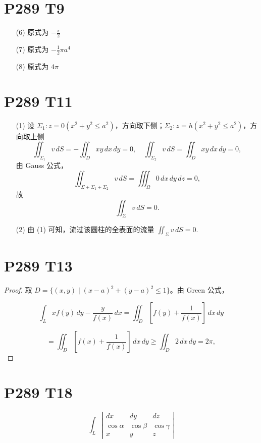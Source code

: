 \documentclass{article}
\begin{document}
\section*{P289 T9}

\begin{itemize}
    \item [(6)] 原式为 $-\frac{\pi}{2}$
    \item [(7)] 原式为 $-\frac{1}{2}\pi a^4$
    \item [(8)] 原式为 $4\pi$
\end{itemize}

\section{P289 T11}

\begin{itemize}
    \item [(1)] 设 \(\Sigma_1: z = 0 (x^2 + y^2 \leq a^2)\)，方向取下侧；\(\Sigma_2: z = h(x^2 + y^2 \leq a^2)\)，方向取上侧
\[
\iint_{\Sigma_1} v \, dS = - \iint_D xy \, dx \, dy = 0, \quad \iint_{\Sigma_2} v \, dS = \iint_D xy \, dx \, dy = 0,
\]
由 Gauss 公式，
\[
\iint_{\Sigma + \Sigma_1 + \Sigma_2} v \, dS = \iiint_\Omega 0 \, dx \, dy \, dz = 0,
\]
故
\[
\iint_{\Sigma} v \, dS = 0.
\]

\item [(2)] 由 (1) 可知，流过该圆柱的全表面的流量 \(\iint_{\Sigma} v \, dS = 0\).
\end{itemize}

\section*{P289 T13}

\begin{proof}
    取 \( D = \{(x, y) \mid (x - a)^2 + (y - a)^2 \leq 1\} \)。由 Green 公式，

\[
\int_L x f(y) \, dy - \frac{y}{f(x)} \, dx = \iint_D \left[ f(y) + \frac{1}{f(x)} \right] \, dx \, dy
\]

\[
= \iint_D \left[ f(x) + \frac{1}{f(x)} \right] \, dx \, dy \geq \iint_D 2 \, dx \, dy = 2\pi,
\]
\end{proof}

\section*{P289 T18}


\[
\int_L \left| \begin{array}{ccc}
dx & dy & dz \\ 
\cos \alpha & \cos \beta & \cos \gamma \\ 
x & y & z 
\end{array} \right|
\]
\end{document}
